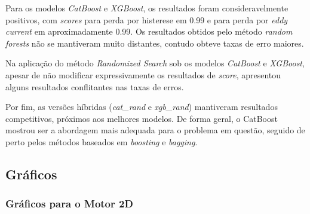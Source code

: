 \documentclass{article}
\begin{document}
Para os modelos \textit{CatBoost} e \textit{XGBoost}, os resultados foram consideravelmente positivos, com \textit{scores} para perda por histerese em 0.99 e para perda por \textit{eddy current} em aproximadamente 0.99. Os resultados obtidos pelo método \textit{random forests} não se mantiveram muito distantes, contudo obteve taxas de erro maiores.

Na aplicação do método \textit{Randomized Search} sob os modelos \textit{CatBoost} e \textit{XGBoost}, apesar de não modificar expressivamente os resultados de \textit{score}, apresentou alguns resultados conflitantes nas taxas de erros.

Por fim, as versões híbridas (\textit{cat\_rand} e \textit{xgb\_rand}) mantiveram resultados competitivos, próximos aos melhores modelos. De forma geral, o CatBoost mostrou ser a abordagem mais adequada para o problema em questão, seguido de perto pelos métodos baseados em \textit{boosting} e \textit{bagging}.

\newpage

\subsection{Gráficos}

\subsubsection{Gráficos para o Motor 2D}
\end{document}
